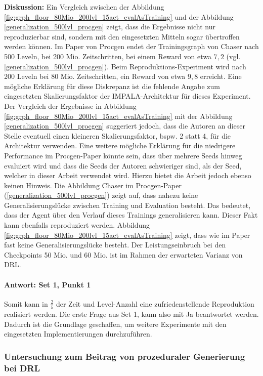 \textbf{Diskussion:} Ein Vergleich zwischen der Abbildung \ref{fig:grph_floor_80Mio_200lvl_15act_evalAsTraining} und der Abbildung \ref{generalization_500lvl_procgen} zeigt, dass die Ergebnisse nicht nur reproduzierbar sind, sondern mit den eingesetzten Mitteln sogar übertroffen werden können. Im Paper von Procgen endet der Trainingsgraph von Chaser nach 500 Leveln, bei 200 Mio. Zeitschritten, bei einem Reward von etwa $7,2$ (vgl. \ref{generalization_500lvl_procgen}). Beim Reproduktions-Experiment wird nach 200 Leveln bei 80 Mio. Zeitschritten, ein Reward von etwa $9,8$ erreicht. Eine mögliche Erklärung für diese Diskrepanz ist die fehlende Angabe zum eingesetzten Skalierungsfaktor der IMPALA-Architektur für dieses Experiment. Der Vergleich der Ergebnisse in Abbildung \ref{fig:grph_floor_80Mio_200lvl_15act_evalAsTraining} mit der Abbildung \ref{generalization_500lvl_procgen} suggeriert jedoch, dass die Autoren an dieser Stelle eventuell einen kleineren Skalierungsfaktor, bspw. 2 statt 4, für die Architektur verwenden. Eine weitere mögliche Erklärung für die niedrigere Performance im Procgen-Paper könnte sein, dass über mehrere Seeds hinweg evaluiert wird und dass die Seeds der Autoren schwieriger sind, als der Seed, welcher in dieser Arbeit verwendet wird. Hierzu bietet die Arbeit \cite{cobbe2019procgen} jedoch ebenso keinen Hinweis. Die Abbildung Chaser im Procgen-Paper (\ref{generalization_500lvl_procgen}) zeigt auf, dass nahezu keine Generalisierungslücke zwischen Training und Evaluation besteht. Das bedeutet, dass der Agent über den Verlauf dieses Trainings generalisieren kann. Dieser Fakt kann ebenfalls reproduziert werden. Abbildung \ref{fig:grph_floor_80Mio_200lvl_15act_evalAsTraining} zeigt, dass wie im Paper fast keine Generalisierungslücke besteht. Der Leistungseinbruch bei den Checkpoints 50 Mio. und 60 Mio. ist im Rahmen der erwarteten Varianz von DRL. 

\paragraph{Antwort: Set 1, Punkt 1}
Somit kann in $\frac{2}{5}$ der Zeit und Level-Anzahl eine zufriedenstellende Reproduktion realisiert werden. Die erste Frage aus Set 1, kann also mit \dq Ja\dq{} beantwortet werden. Dadurch ist die Grundlage geschaffen, um weitere Experimente mit den eingesetzten Implementierungen durchzuführen. 


\subsubsection{Untersuchung zum Beitrag von prozeduraler Generierung bei DRL}\label{subsec:absch_EXP_durch_reproduktion_generalisierung}
